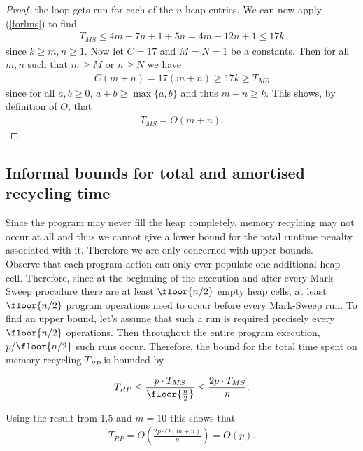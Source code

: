 \documentclass{article}
\begin{document}
\begin{proof}
    the loop gets run for each of the $n$ heap entries. We can now apply (\ref{forlms})
    to find
    \begin{align}
        \label{tmsbound}
        T_{MS} \leq 4m + 7n + 1 + 5n = 4m + 12n + 1 \leq 17k
    \end{align}
    since $k\geq m,n \geq 1$. Now let $C=17$ and $M=N=1$ be a constants. 
    Then for all $m,n$ such that $m\geq M$ or $n\geq N$ we have
    \begin{align*}
        C(m+n) = 17(m+n) \geq 17k \geq T_{MS}
    \end{align*}
    since for all $a,b\geq 0$, $a+b \geq \max\{a,b\}$ and thus $m+n\geq k$.
    This shows, by definition of $O$, that
    \begin{align}
        \label{tmsbound}
        T_{MS} = O(m+n).
    \end{align}
\end{proof}

\subsection{Informal bounds for total and amortised recycling time}

Since the program may never fill the heap completely, memory recylcing may not occur
at all and thus we cannot give a lower bound for the total runtime penalty associated
with it. Therefore we are only concerned with upper bounds.\\
Observe that each program action can only ever populate one additional heap cell.
Therefore, since at the beginning of the execution and after every Mark-Sweep
procedure there are at least $\floor{n/2}$ empty heap cells, at least $\floor{n/2}$ program operations
need to occur before every Mark-Sweep run. To find an upper bound, let's assume that
such a run is required precisely every $\floor{n/2}$ operations. Then throughout the
entire program execution, $p/\floor{n/2}$ such runs occur. Therefore, the bound
for the total time spent on memory recycling $T_{RP}$ is bounded by 

\begin{align*}
    T_{RP} \leq \frac{p\cdot T_{MS}}{\floor{\frac{n}{2}}} \leq \frac{2p\cdot T_{MS}}{n}.
\end{align*}

Using the result from 1.5 and $m=10$ this shows that
\begin{align*}
    T_{RP} = O\left(\frac{2p\cdot O(m+n)}{n}\right) = O(p).
\end{align*}
\end{document}
